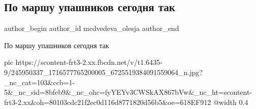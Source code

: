 
 
 
 
 
 
\subsection{По маршу упашников сегодня так}
\label{sec:14_10_2021.fb.medvedeva_olesja.1.marsh_upa_kiev}
 
\ifcmt
 author_begin
   author_id medvedeva_olesja
 author_end
\fi

По маршу упашников сегодня так

\ifcmt
  pic https://scontent-frt3-2.xx.fbcdn.net/v/t1.6435-9/245950337_1716577765200005_6725519384091559064_n.jpg?_nc_cat=103&ccb=1-5&_nc_sid=8bfeb9&_nc_ohc=fyYEYv3CWSkAX867bVw&_nc_ht=scontent-frt3-2.xx&oh=80103cdc21f2ec0d116d8771820d56b5&oe=618EF912
  @width 0.4
\fi

